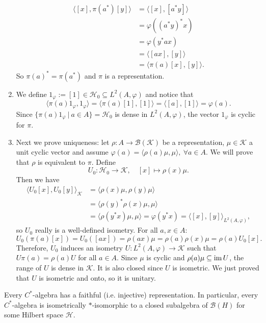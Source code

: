 \begin{myproof}
\begin{enumerate}
    \begin{align*}
      \langle [x] , \pi(a^*) [y]\rangle &= \langle [x], [a^* y]\rangle\\
      &= \varphi((a^* y)^* x)\\
      &= \varphi(y^* ax)\\
      &= \langle [ax], [y] \rangle\\
      &= \langle \pi(a) [x], [y]\rangle.
    \end{align*}
    So $\pi(a) ^* = \pi(a^*)$ and $\pi$ is a representation.
    \item We define $1_\varphi := [1] \in \mathcal{H}_0 \subseteq L^2 (A, \varphi)$
    and notice that 
    $$\langle \pi(a) 1_\varphi, 1_\varphi \rangle = \langle \pi(a) [1], [1] \rangle = \langle[a], [1] \rangle = \varphi(a).$$
    Since $\{\pi (a) 1_\varphi\ |\ a \in A\} = \mathcal{H}_0$ is dense in $L^2 (A, \varphi)$, the vector $1_\varphi$ is cyclic for $\pi$.
    \item Next we prove uniqueness: let $\rho: A \to \mathcal{B} (\mathcal{K})$ be a representation, $\mu \in \mathcal{K}$ a unit cyclic vector and 
    assume $\varphi(a) = \langle \rho(a)\mu, \mu\rangle,\ \forall a \in A$.
    We will prove that $\rho$ is equivalent to $\pi$. Define 
    $$U_0 : \mathcal{H}_0 \to \mathcal{K},\quad [x] \mapsto \rho(x) \mu.$$
    Then we have 
    \begin{align*}
      \langle U_0 [x], U_0 [y] \rangle_{\mathcal{K}} &= \langle \rho (x) \mu, \rho(y) \mu \rangle\\
      &= \langle \rho(y) ^* \rho(x)\mu, \mu \rangle\\
      &= \langle \rho (y^* x) \mu, \mu\rangle = \varphi(y^* x) = \langle [x], [y] \rangle_{L^2 (A, \varphi)},
    \end{align*}
    so $U_0$ really is a well-defined isometry. For all $a, x \in A$:
    $$U_0 (\pi (a) [x]) = U_0 ([ax]) = \rho (ax) \mu = \rho(a) \rho(x) \mu = \rho(a) U_0 [x].$$
    Therefore, $U_0$ induces an isometry $U: L^2 (A, \varphi) \to \mathcal{K}$
    such that $U\pi(a) = \rho (a) U$ for all $a \in A$. Since $\mu$ is cyclic and $\rho(a) \mu \subseteq \operatorname{im} U$, the range of $U$ is dense in $\mathcal{K}$.
    It is also closed since $U$ is isometric. We just proved that $U$ is isometric and onto, so it is unitary. \qedhere
  \end{enumerate}
\end{myproof}

\begin{corollary}
  Every $C^*$-algebra has a faithful (i.e. injective) representation. In particular, every $C^*$-algebra is isometrically $*$-isomorphic to a closed subalgebra of $\mathcal{B} (H)$
  for some Hilbert space $\mathcal{H}$.
\end{corollary}

